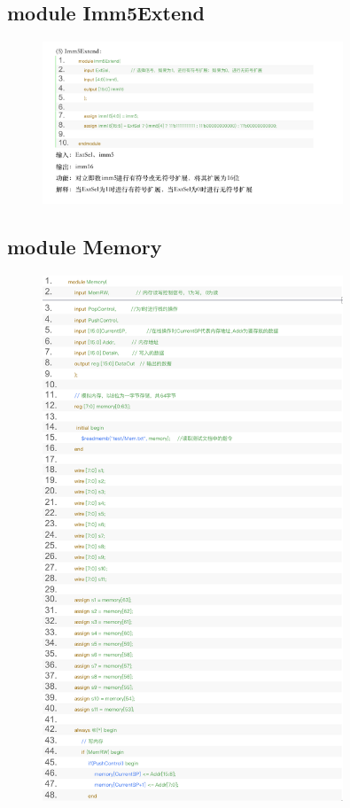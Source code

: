 \documentclass{article}
\begin{document}
\subsection{module Imm5Extend}
\begin{figure}[H]
    \centering
    \includegraphics[width=0.8\textwidth]{pic/16.png}
  
    \end{figure}


\subsection{module Memory}
\begin{figure}[H]
    \centering
    \includegraphics[width=0.8\textwidth]{pic/17.png}
  
    \end{figure}
\end{document}
